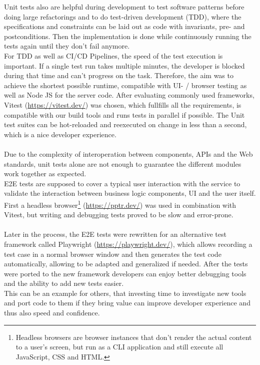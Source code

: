 Unit tests also are helpful during development to test software patterns before doing large refactorings and to do test-driven development (TDD), where the specifications and constraints can be laid out as code with invariants, pre- and postconditions.
Then the implementation is done while continuously running the tests again until they don't fail anymore.
\\
For TDD as well as CI/CD Pipelines, the speed of the test execution is important. If a single test run takes multiple minutes, the developer is blocked during that time and can't progress on the task.
Therefore, the aim was to achieve the shortest possible runtime, compatible with UI- / browser testing as well as Node JS for the server code.
After evaluating commonly used frameworks, Vitest (\url{https://vitest.dev/}) was chosen, which fullfills all the requirements, is compatible with our build tools and runs tests in parallel if possible. The Unit test suites can be hot-reloaded and reexecuted on change in less than a second, which is a nice developer experience.
\\\\
Due to the complexity of interoperation between components, APIs and the Web standards, unit tests alone are not enough to guarantee the different modules work together as expected. 
\\
E2E tests are supposed to cover a typical user interaction with the service to validate the interaction between business logic components, UI and the user itself.
First a headless browser\footnote{Headless browsers are browser instances that don't render the actual content to a user's screen, but run as a CLI application and still execute all JavaScript, CSS and HTML.} (\url{https://pptr.dev/}) was used in combination with Vitest,
but writing and debugging tests proved to be slow and error-prone.
\\\\
Later in the process, the E2E tests were rewritten for an alternative test framework called Playwright (\url{https://playwright.dev/}), which allows recording a test case in a normal browser window and then generates the test code automatically, allowing to be adapted and generalized if needed.
After the tests were ported to the new framework developers can enjoy better debugging tools and the ability to add new tests easier.
\\
This can be an example for others, that investing time to investigate new tools and port code to them if they bring value can improve developer experience and thus also speed and confidence.

